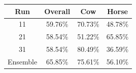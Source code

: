 \begin{tabular}{cccc}
\toprule
Run & Overall & Cow & Horse \\
\midrule
11 & 59.76\% & 70.73\% & 48.78\% \\
21 & 58.54\% & 51.22\% & 65.85\% \\
31 & 58.54\% & 80.49\% & 36.59\% \\
\midrule
Ensemble & 65.85\% & 75.61\% & 56.10\% \\
\bottomrule
\end{tabular}
